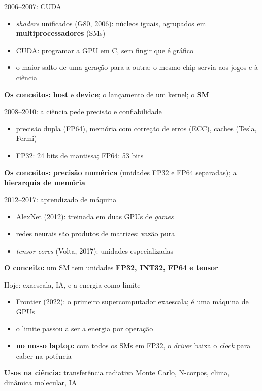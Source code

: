 \documentclass[aspectratio=169,11pt]{beamer}
\begin{document}
\begin{frame}{2006--2007: CUDA}
  \begin{itemize}
    \item \emph{shaders} unificados (G80, 2006): núcleos iguais, agrupados em \textbf{multiprocessadores} (SMs)
    \item CUDA: programar a GPU em C, sem fingir que é gráfico
    \item o maior salto de uma geração para a outra: o mesmo chip servia aos jogos e à ciência
  \end{itemize}
  \vfill
  \textbf{Os conceitos:} \textbf{host} e \textbf{device}; o lançamento de um kernel; o \textbf{SM}
\end{frame}

\begin{frame}{2008--2010: a ciência pede precisão e confiabilidade}
  \begin{itemize}
    \item precisão dupla (FP64), memória com correção de erros (ECC), caches (Tesla, Fermi)
    \item FP32: 24 bits de mantissa; FP64: 53 bits
  \end{itemize}
  \vfill
  \textbf{Os conceitos:} \textbf{precisão numérica} (unidades FP32 e FP64 separadas); a \textbf{hierarquia de memória}
\end{frame}

\begin{frame}{2012--2017: aprendizado de máquina}
  \begin{itemize}
    \item AlexNet (2012): treinada em duas GPUs de \emph{games}
    \item redes neurais são produtos de matrizes: vazão pura
    \item \emph{tensor cores} (Volta, 2017): unidades especializadas
  \end{itemize}
  \vfill
  \textbf{O conceito:} um SM tem unidades \textbf{FP32, INT32, FP64 e tensor}
\end{frame}

\begin{frame}{Hoje: exaescala, IA, e a energia como limite}
  \begin{itemize}
    \item Frontier (2022): o primeiro supercomputador exaescala; é uma máquina de GPUs
    \item o limite passou a ser a energia por operação
    \item \textbf{no nosso laptop:} com todos os SMs em FP32, o \emph{driver} baixa o \emph{clock} para caber na potência
  \end{itemize}
  \vfill
  \textbf{Usos na ciência:} transferência radiativa Monte Carlo, N-corpos, clima, dinâmica molecular, IA
\end{frame}
\end{document}
